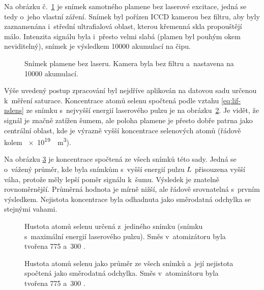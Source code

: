 Na obrázku č.~\ref{fig:lif-flame} je snímek samotného plamene bez laserové
excitace, jedná se tedy o~jeho vlastní záření.
Snímek byl pořízen ICCD kamerou bez filtru, aby byly zaznamenána i~střední
ultrafialová oblast, kterou křemenná skla propouštějí málo.
Intenzita signálu byla i~přesto velmi slabá
(plamen byl pouhým okem neviditelný),
snímek je výsledkem \num{10000} akumulací na čipu.

\begin{figure}[htp]
	\centering
	
	\caption{Snímek plamene bez laseru.
		Kamera byla bez filtru a~nastavena na \num{10000} akumulací.}
	\label{fig:lif-flame}
\end{figure}

Výše uvedený postup zpracování byl nejdříve aplikován na datovou sadu
určenou k~měření saturace.
Koncentrace atomů selenu spočtená podle vztahu \eqref{eq:lif-ndens}
ze snímku s~nejvyšší energií laserového pulzu je
na obrázku~\ref{fig:lif-concentration-single}.
Je vidět, že signál je značně zatížen šumem, ale poloha plamene
je přesto dobře patrna jako centrální oblast,
kde je výrazně vyšší koncentrace selenových atomů
(řádově kolem \SI{e19}{\per\metre\cubed}).

Na obrázku \ref{fig:lif-concentration-mean} je koncentrace spočtená ze všech
snímků této sady.
Jedná se o~vážený průměr, kde byla snímkům s~vyšší energií pulzu $L$
přisouzena vyšší váha, protože měly lepší poměr signálu k~šumu.
Výsledek je znatelně rovnoměrnější.
Průměrná hodnota je mírně nižší, ale řádově srovnatelná s~prvním výsledkem.
Nejistota koncentrace byla odhadnuta jako směrodatná odchylka
se stejnými vahami.

\begin{figure}[htp]
	\centering
	
	\caption{Hustota atomů selenu určená z~jediného snímku
		(snímku s~maximální energií laserového pulzu).
		Směs v~atomizátoru byla tvořena \SI{775}{\sccm} 
		a~\SI{300}{\sccm} .}
	\label{fig:lif-concentration-single}
\end{figure}

\begin{figure}[htp]
	\centering
	
	
	\caption{Hustota atomů selenu jako průměr ze všech snímků
		a~její nejistota spočtená jako směrodatná odchylka.
		Směs v~atomizátoru byla tvořena \SI{775}{\sccm} 
		a~\SI{300}{\sccm} .}
	\label{fig:lif-concentration-mean}
\end{figure}

